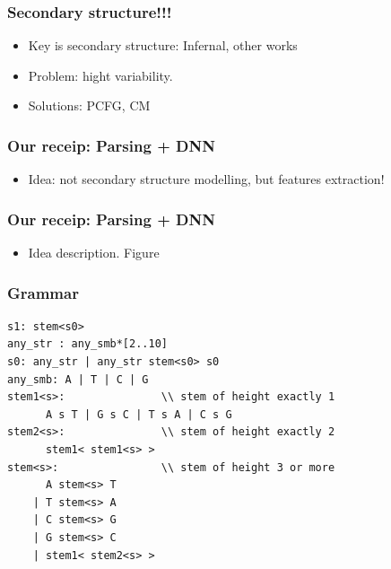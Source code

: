 \documentclass[xcolor=table]{beamer}
\begin{document}
\begin{frame}
  \transwipe[direction=90]
  \frametitle{Secondary structure!!!}

\begin{itemize}
  \item Key is secondary structure: Infernal, other works
  \item Problem: hight variability.
  \item Solutions: PCFG, CM
\end{itemize}

\end{frame}


\begin{frame}
  \transwipe[direction=90]
  \frametitle{Our receip: Parsing + DNN}

\begin{itemize}
  \item Idea: not secondary structure modelling, but features extraction!
\end{itemize}

\end{frame}



\begin{frame}
  \transwipe[direction=90]
  \frametitle{Our receip: Parsing + DNN}

\begin{itemize}
  \item Idea description. Figure
\end{itemize}

\end{frame}

\begin{frame}[fragile]
  \transwipe[direction=90]
  \frametitle{Grammar}
\begin{verbatim}
s1: stem<s0>
any_str : any_smb*[2..10]
s0: any_str | any_str stem<s0> s0
any_smb: A | T | C | G
stem1<s>:               \\ stem of height exactly 1
      A s T | G s C | T s A | C s G
stem2<s>:               \\ stem of height exactly 2
      stem1< stem1<s> >
stem<s>:                \\ stem of height 3 or more
      A stem<s> T
    | T stem<s> A
    | C stem<s> G
    | G stem<s> C
    | stem1< stem2<s> >
\end{verbatim}

\end{frame}
\end{document}
